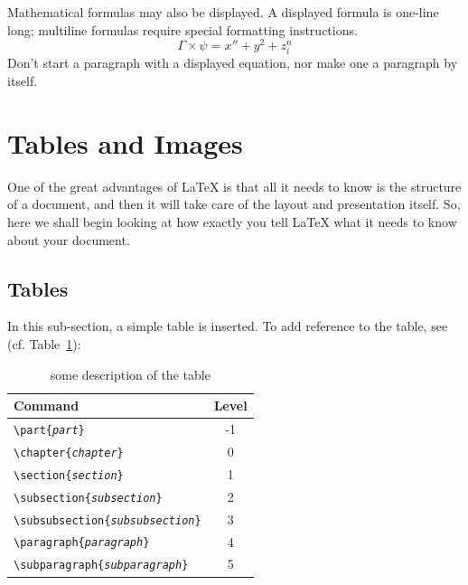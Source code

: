 \documentclass{UniVieCS_PhD}
\begin{document}
	Mathematical formulas may also be displayed.  A
	displayed formula 
	is 
	one-line long; multiline
	formulas require special formatting instructions.
	\[  \Gamma \times  \psi = x'' + y^{2} + z_{i}^{n}\]
	Don't start a paragraph with a displayed equation,
	nor make one a paragraph by itself.
	
	\section{Tables and Images}
	One of the great advantages of \LaTeX{} is that all it needs to know is
	the structure of a document, and then it will take care of the layout
	and presentation itself.  So, here we shall begin looking at how exactly
	you tell \LaTeX{} what it needs to know about your document.
	
	\subsection{Tables}
	In this sub-section, a simple table is inserted. To add reference to the table, see (cf. Table~\hyperref[tab:table example]{\ref{tab:table example}}):
	
	\begin{table}[htb]
		\centering
		\begin{tabular}{|p{}|c|}
			
			\hline  %
			Command & Level \\ \hline  %
			\texttt{\textbackslash part\{\emph{part}\}} & -1 \\
			\texttt{\textbackslash chapter\{\emph{chapter}\}} & 0 \\
			\texttt{\textbackslash section\{\emph{section}\}} & 1 \\
			\texttt{\textbackslash subsection\{\emph{subsection}\}} & 2 \\
			\texttt{\textbackslash subsubsection\{\emph{subsubsection}\}} & 3 \\
			\texttt{\textbackslash paragraph\{\emph{paragraph}\}} & 4 \\
			\texttt{\textbackslash subparagraph\{\emph{subparagraph}\}} & 5 \\
			\hline
			
		\end{tabular}
		\caption{some description of the table}
		\label{tab:table example}
	\end{table}
	
\end{document}
